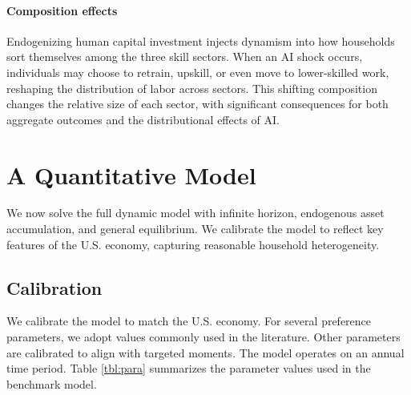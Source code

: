 \documentclass[12pt]{article}
\begin{document}
\paragraph{Composition effects} Endogenizing human capital investment injects dynamism into how households sort themselves among the three skill sectors. When an AI shock occurs, individuals may choose to retrain, upskill, or even move to lower-skilled work, reshaping the distribution of labor across sectors. This shifting composition changes the relative size of each sector, with significant consequences for both aggregate outcomes and the distributional effects of AI.


\section{A Quantitative Model \protect\label{sec:quant_model}}

We now solve the full dynamic model with infinite horizon, endogenous asset accumulation, and general equilibrium. 
We calibrate the model to reflect key features of the U.S. economy,
capturing reasonable household heterogeneity. 

\subsection{Calibration \protect\label{sec:calib}}

We calibrate the model to match the U.S. economy. For several preference
parameters, we adopt values commonly used in the literature. Other
parameters are calibrated to align with targeted moments. The model
operates on an annual time period. Table \ref{tbl:para} summarizes
the parameter values used in the benchmark model.
\end{document}
